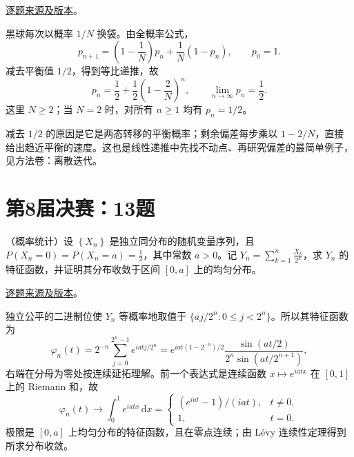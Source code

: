 \href{https://github.com/lzxcr/cmc-mathematics/blob/64916fa1fdbc3e444a652eca204d5669058ee321/src/problems/finals/07/15.md}{逐题来源及版本}。

\begin{solve}

黑球每次以概率 $1/N$ 换袋。由全概率公式，
\[
p_{n+1}=\left(1-\frac1N\right)p_n+\frac1N(1-p_n),\qquad p_0=1.
\]
减去平衡值 $1/2$，得到等比递推，故
\[
p_n=\frac12+\frac12\left(1-\frac2N\right)^n,\qquad \lim_{n\to\infty}p_n=\frac12.
\]
这里 $N\geq2$；当 $N=2$ 时，对所有 $n\geq1$ 均有 $p_n=1/2$。

\end{solve}

\begin{remark}[方法与条件]

减去 $1/2$ 的原因是它是两态转移的平衡概率；剩余偏差每步乘以 $1-2/N$，直接给出趋近平衡的速度。这也是线性递推中先找不动点、再研究偏差的最简单例子，见方法卷：离散迭代。

\end{remark}

\section{第8届决赛：13题}\label{pr:fin08-hi:13}

\begin{example}[公开题解转录]\label{q:fin08-hi:13}

（概率统计）设 $\left\{X_{n}\right\}$ 是独立同分布的随机变量序列，且 $P\left(X_{n}=0\right)=P\left(X_{n}=a\right)=\frac{1}{2}$，其中常数 $a>0$。记 $Y_{n}=\sum_{k=1}^{n}\frac{X_{k}}{2^{k}}$，求 $Y_{n}$ 的特征函数，并证明其分布收敛于区间 $[0,a]$ 上的均匀分布。

\end{example}

\href{https://github.com/lzxcr/cmc-mathematics/blob/64916fa1fdbc3e444a652eca204d5669058ee321/src/problems/finals/08/15.md}{逐题来源及版本}。

\begin{solve}

独立公平的二进制位使 $Y_n$ 等概率地取值于 $\{aj/2^n:0\leq j<2^n\}$。所以其特征函数为
\[
\varphi_n(t)=2^{-n}\sum_{j=0}^{2^n-1}e^{iatj/2^n}
=e^{iat(1-2^{-n})/2}\frac{\sin(at/2)}{2^n\sin(at/2^{n+1})},
\]
右端在分母为零处按连续延拓理解。前一个表达式是连续函数 $x\mapsto e^{iatx}$ 在 $[0,1]$ 上的 Riemann 和，故
\[
\varphi_n(t)\longrightarrow\int_0^1e^{iatx}\,\mathrm dx
=\begin{cases}(e^{iat}-1)/(iat),&t\ne0,\\1,&t=0.\end{cases}
\]
极限是 $[0,a]$ 上均匀分布的特征函数，且在零点连续；由 Lévy 连续性定理得到所求分布收敛。

\end{solve}


